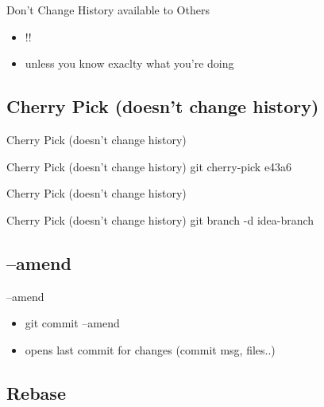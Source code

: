 \documentclass{beamer}
\begin{document}
\begin{frame}{Don't Change History available to Others}
  \begin{itemize}
    \item
      !!
    \item
      unless you know exaclty what you're doing
  \end{itemize}
\end{frame}

\subsection{Cherry Pick (doesn't change history)}

\begin{frame}{Cherry Pick (doesn't change history)}
    \centering
    \hfill\vfill
\end{frame}

\begin{frame}{Cherry Pick (doesn't change history)}
  git cherry-pick e43a6
\end{frame}

\begin{frame}{Cherry Pick (doesn't change history)}
    \centering
    \hfill\vfill
\end{frame}

\begin{frame}{Cherry Pick (doesn't change history)}
  git branch -d idea-branch
\end{frame}

\subsection{--amend}

\begin{frame}{--amend}
  \begin{itemize}
    \item
      git commit --amend
    \item
      opens last commit for changes (commit msg, files..)
  \end{itemize}
\end{frame}

\subsection{Rebase}
\end{document}
